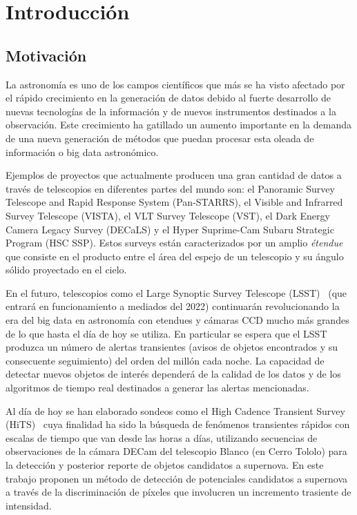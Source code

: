 \chapter{Introducción}
\label{ch:introduction}

\section{Motivaci\'on}
La astronomía es uno de los campos científicos que más se ha visto afectado por el rápido crecimiento en la generación de datos debido al fuerte desarrollo de nuevas tecnologías de la información y  de nuevos instrumentos destinados a la observación. Este crecimiento ha gatillado un aumento importante en la demanda de una nueva generaci\'on de m\'etodos que puedan procesar esta oleada de informaci\'on o big data astron\'omico.
\bigskip

Ejemplos de proyectos que actualmente producen una gran cantidad de datos a trav\'es de telescopios en diferentes partes del mundo son: el Panoramic Survey Telescope and Rapid Response System (Pan-STARRS), el Visible and Infrarred Survey Telescope (VISTA), el VLT Survey Telescope (VST), el Dark Energy Camera Legacy Survey (DECaLS) y el Hyper Suprime-Cam Subaru Strategic Program (HSC SSP). Estos surveys est\'an caracterizados por un amplio \textit{\'etendue}  que consiste en el producto entre el \'area del espejo de un telescopio y su \'angulo s\'olido proyectado en el cielo.
\bigskip

En el futuro, telescopios como el Large Synoptic Survey Telescope (LSST)~\cite{lsst} (que entrará en funcionamiento a mediados del 2022) continuar\'an revolucionando la era del big data en astronom\'ia con etendues y c\'amaras CCD mucho m\'as grandes de lo que hasta el d\'ia de hoy se utiliza. En particular se espera que el LSST produzca un n\'umero de alertas transientes (avisos de objetos encontrados y su consecuente seguimiento) del orden del mill\'on cada noche. La capacidad de detectar nuevos objetos de inter\'es depender\'a de la calidad de los datos y de los algoritmos de tiempo real  destinados a generar las alertas mencionadas. 
\bigskip

Al d\'ia de hoy se han elaborado sondeos como el High Cadence Transient Survey (HiTS)~\cite{hits} cuya finalidad ha sido la b\'usqueda de fen\'omenos transientes r\'apidos con escalas de tiempo que van desde las horas a d\'ias, utilizando secuencias de observaciones de la c\'amara DECam del telescopio Blanco (en Cerro Tololo) para la detecci\'on y posterior reporte de objetos candidatos a supernova. En este trabajo proponen un m\'etodo de detecci\'on de potenciales candidatos a supernova a trav\'es de la discriminaci\'on de p\'ixeles que involucren un incremento trasiente de intensidad.
\bigskip

